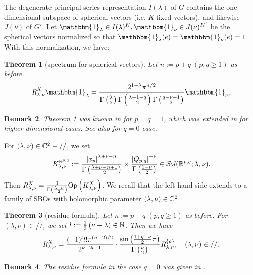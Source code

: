 \documentclass[12pt]{article} %
\newtheorem{theorem}{Theorem}
\newcommand{\sol}{\mathcal{S}\!{\it ol}(\R^{p,q};\lambda,\nu)}
\newtheorem{remark}[theorem]{Remark}
\theoremstyle{definition}
\theoremstyle{exampstyle} \newtheorem{examp}[theorem]{Theorem}
\newcommand{\Op}{\mbox{\normalfont Op}}
\newcommand{\OpR}{\mbox{\it R}}
\renewcommand{\Q}{Q_{p,q}}
\renewcommand{\setminus}{-}
\begin{document}
The degenerate principal series representation $I(\lambda)$ of $G$ contains the one-dimensional subspace of spherical vectors (i.e. $K$-fixed vectors), and likewise $J(\nu)$ of $G'$.
Let $\mathbbm{1}_\lambda\in I(\lambda)^K,\mathbbm{1}_\nu\in J(\nu)^{K'}$ be the spherical vectors normalized so that $\mathbbm{1}_\lambda(e)=\mathbbm{1}_\nu(e)=1$. With this normalization, we have:
\begin{theorem}[spectrum for spherical vectors]\label{thm:spherical}
	Let $n:=p+q\;(p,q\ge1)$ as before.
\[ \OpR^X_{\lambda, \nu} \mathbbm{1}_{\lambda} =  \frac{2^{1 -
\lambda}\pi^{n / 2}}{\Gamma \left( \frac{\lambda}{2} \right)
\Gamma \left(  \frac{\lambda + 1-q}{2} \right) \Gamma \left(
\frac{q - \nu + 1}{2} \right)} \mathbbm{1}_{\nu}. \]
\end{theorem}
\begin{remark}
	Theorem \ref{thm:spherical} was known in \cite[Lem. A.5]{bernstein2004estimates} for $p=q=1$, which was extended in \cite[Thm. 1.1]{clerc2011generalized} for higher dimensional cases.
	See also \cite[Prop.\ 7.4]{kobayashi2015symmetry} for $q=0$ case.
\end{remark}
For $(\lambda,\nu)\in\C^2\setminus//$, we set 
\[K_{\lambda,\nu}^{\mathbb{R}^{p,q}}:=\frac{\myabs{x_p}^{\lambda+\nu-n}}{\Gamma\left( \frac{\lambda+\nu-n+1}{2} \right)}\times
\frac{\myabs{\Q}^{-\nu}}{\Gamma\left( \frac{1-\nu}{2} \right)}\in\sol.\]
Then $R_{\lambda,\nu}^X=\frac{1}{\Gamma\left( \frac{\lambda-\nu}{2} \right)}\Op\left( K_{\lambda,\nu}^X \right)$. We recall that the left-hand side extends to a family of SBOs with holomorphic
parameter $(\lambda,\nu)\in\mathbb{C}^2$.
\begin{theorem}[residue formula]
	Let $n:=p+q\;(p,q\ge1)$ as before.
	For $(\lambda,\nu)\in//$, we set $l:=\frac{1}{2}\left( \nu-\lambda \right)\in\mathbb{N}$. Then we have
  \[\OpR_{\lambda,\nu}^X  = \frac{ (- 1)^l l!\pi^{(n - 2) / 2} 
		}{2^{ \nu + 2 l-1}}\cdot  \frac{\sin\left( \frac{1+q-\nu}{2}\pi \right)}{\Gamma\left( \frac{\nu}{2} \right)}
     \OpR_{\lambda,\nu}^{ \left\{ o \right\} },\quad(\lambda,\nu)\in// . \]
	\end{theorem}
	\begin{remark}
		The residue formula in the case $q=0$ was given in \cite[Thm. 12.2]{kobayashi2015symmetry}.
	\end{remark}
\end{document}
